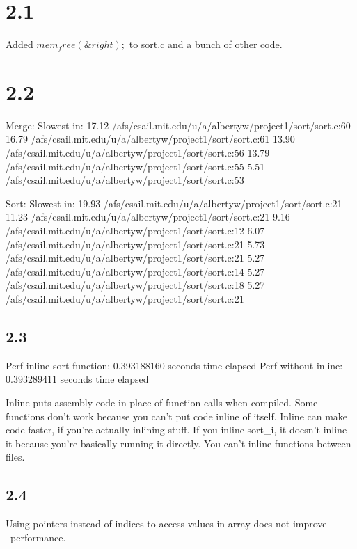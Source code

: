 \documentclass[12pt]{article}
\begin{document}
\maketitle
\section{2.1}
Added $mem_free(\&right);$ to sort.c and a bunch of other code.  

\section{2.2}
Merge:
Slowest in:
   17.12 /afs/csail.mit.edu/u/a/albertyw/project1/sort/sort.c:60
   16.79 /afs/csail.mit.edu/u/a/albertyw/project1/sort/sort.c:61
   13.90 /afs/csail.mit.edu/u/a/albertyw/project1/sort/sort.c:56
   13.79 /afs/csail.mit.edu/u/a/albertyw/project1/sort/sort.c:55
    5.51 /afs/csail.mit.edu/u/a/albertyw/project1/sort/sort.c:53

Sort:
Slowest in:
   19.93 /afs/csail.mit.edu/u/a/albertyw/project1/sort/sort.c:21
   11.23 /afs/csail.mit.edu/u/a/albertyw/project1/sort/sort.c:21
    9.16 /afs/csail.mit.edu/u/a/albertyw/project1/sort/sort.c:12
    6.07 /afs/csail.mit.edu/u/a/albertyw/project1/sort/sort.c:21
    5.73 /afs/csail.mit.edu/u/a/albertyw/project1/sort/sort.c:21
    5.27 /afs/csail.mit.edu/u/a/albertyw/project1/sort/sort.c:14
    5.27 /afs/csail.mit.edu/u/a/albertyw/project1/sort/sort.c:18
    5.27 /afs/csail.mit.edu/u/a/albertyw/project1/sort/sort.c:21


\subsection{2.3}
Perf inline sort function: 0.393188160  seconds time elapsed
Perf without inline: 0.393289411  seconds time elapsed

Inline puts assembly code in place of function calls when compiled.  Some functions don't work because you can't put code inline of itself.
Inline can make code faster, if you're actually inlining stuff.  
If you inline sort_i, it doesn't inline it because you're basically running it directly.  
You can't inline functions between files.  

\subsection{2.4}
Using pointers instead of indices to access values in array does not improve \
performance.
\end{document}
